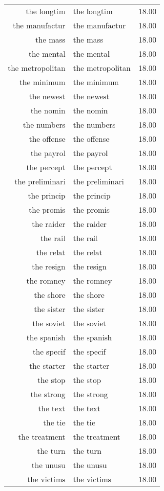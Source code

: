 \begin{table}[ht]
\begin{tabular}{rlr}
  the longtim & the longtim & 18.00 \\ 
  the manufactur & the manufactur & 18.00 \\ 
  the mass & the mass & 18.00 \\ 
  the mental & the mental & 18.00 \\ 
  the metropolitan & the metropolitan & 18.00 \\ 
  the minimum & the minimum & 18.00 \\ 
  the newest & the newest & 18.00 \\ 
  the nomin & the nomin & 18.00 \\ 
  the numbers & the numbers & 18.00 \\ 
  the offense & the offense & 18.00 \\ 
  the payrol & the payrol & 18.00 \\ 
  the percept & the percept & 18.00 \\ 
  the preliminari & the preliminari & 18.00 \\ 
  the princip & the princip & 18.00 \\ 
  the promis & the promis & 18.00 \\ 
  the raider & the raider & 18.00 \\ 
  the rail & the rail & 18.00 \\ 
  the relat & the relat & 18.00 \\ 
  the resign & the resign & 18.00 \\ 
  the romney & the romney & 18.00 \\ 
  the shore & the shore & 18.00 \\ 
  the sister & the sister & 18.00 \\ 
  the soviet & the soviet & 18.00 \\ 
  the spanish & the spanish & 18.00 \\ 
  the specif & the specif & 18.00 \\ 
  the starter & the starter & 18.00 \\ 
  the stop & the stop & 18.00 \\ 
  the strong & the strong & 18.00 \\ 
  the text & the text & 18.00 \\ 
  the tie & the tie & 18.00 \\ 
  the treatment & the treatment & 18.00 \\ 
  the turn & the turn & 18.00 \\ 
  the unusu & the unusu & 18.00 \\ 
  the victims & the victims & 18.00 \\ 

\end{tabular}
\end{table}
